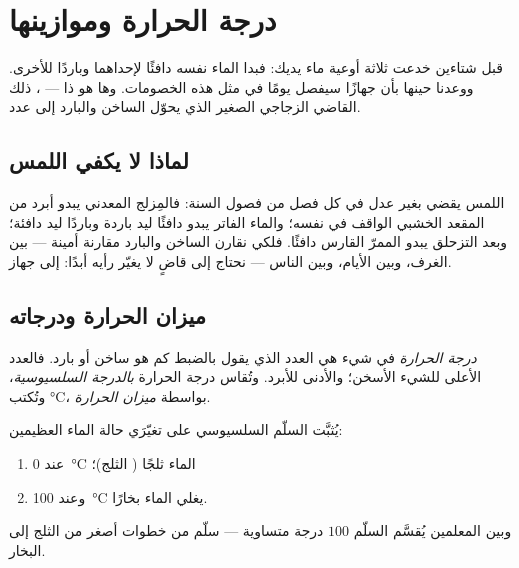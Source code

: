 \chapter{درجة الحرارة وموازينها}\label{ch:g3:temperature-thermometers}

قبل شتاءين خدعت ثلاثة أوعية ماء يديك: فبدا الماء نفسه دافئًا
لإحداهما وباردًا للأخرى. ووعدنا حينها بأن جهازًا سيفصل يومًا في
مثل هذه الخصومات. وها هو ذا --- ، ذلك القاضي الزجاجي
الصغير الذي يحوّل الساخن والبارد إلى عدد.

\section{لماذا لا يكفي اللمس}

\begin{example}\label{ex:g3:temperature-thermometers:unfair}
اللمس يقضي بغير عدل في كل فصل من فصول السنة: فالمِزلج المعدني يبدو
أبرد من المقعد الخشبي الواقف في  نفسه؛ والماء الفاتر يبدو
دافئًا ليد باردة وباردًا ليد دافئة؛ وبعد التزحلق يبدو الممرّ
القارس دافئًا. فلكي نقارن الساخن والبارد مقارنة أمينة --- بين
الغرف، وبين الأيام، وبين الناس --- نحتاج إلى قاضٍ لا يغيّر رأيه
أبدًا: إلى جهاز.
\end{example}

\section{ميزان الحرارة ودرجاته}

\begin{definition}\label{def:g3:temperature-thermometers:temperature}
\emph{درجة الحرارة} في شيء هي العدد الذي يقول
بالضبط كم هو ساخن أو بارد. فالعدد الأعلى للشيء الأسخن؛ والأدنى
للأبرد. وتُقاس درجة الحرارة \emph{بالدرجة
السلسيوسية}، وتُكتب \unit{\celsius}،
بواسطة \emph{ميزان الحرارة}.
\end{definition}

\begin{proposition}\label{prop:g3:temperature-thermometers:milestones}
يُثبَّت السلّم السلسيوسي على تغيّرَي حالة الماء العظيمين:
\begin{enumerate}
  \item عند \qty{0}{\celsius}  الماء ثلجًا ( الثلج)؛
  \item وعند \qty{100}{\celsius} يغلي الماء بخارًا.
\end{enumerate}
وبين المعلمين يُقسَّم السلّم $100$ درجة متساوية --- سلّم من
خطوات أصغر من الثلج إلى البخار.
\end{proposition}

